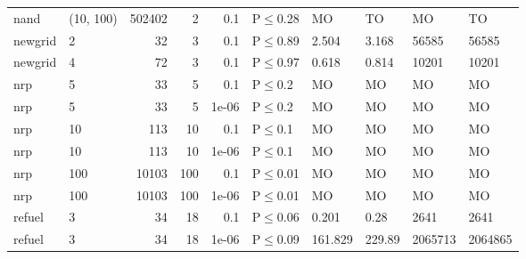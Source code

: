 \begin{longtable}{llrrrlllll}
 nand          & (10, 100) & 	502402 &   2 & 0.1   & P$\leq$0.28  & MO      & TO      & MO      & TO      \\
 newgrid       & 2         &     	32 &   3 & 0.1   & P$\leq$0.89  & 2.504   & 3.168   & 56585   & 56585   \\
 newgrid       & 4         &     	72 &   3 & 0.1   & P$\leq$0.97  & 0.618   & 0.814   & 10201   & 10201   \\
 nrp           & 5         &     	33 &   5 & 0.1   & P$\leq$0.2   & MO      & MO      & MO      & MO      \\
 nrp           & 5         &     	33 &   5 & 1e-06 & P$\leq$0.2   & MO      & MO      & MO      & MO      \\
 nrp           & 10        &    	113 &  10 & 0.1   & P$\leq$0.1   & MO      & MO      & MO      & MO      \\
 nrp           & 10        &    	113 &  10 & 1e-06 & P$\leq$0.1   & MO      & MO      & MO      & MO      \\
 nrp           & 100       &  	10103 & 100 & 0.1   & P$\leq$0.01  & MO      & MO      & MO      & MO      \\
 nrp           & 100       &  	10103 & 100 & 1e-06 & P$\leq$0.01  & MO      & MO      & MO      & MO      \\
 refuel        & 3         &     	34 &  18 & 0.1   & P$\leq$0.06  & 0.201   & 0.28    & 2641    & 2641    \\
 refuel        & 3         &     	34 &  18 & 1e-06 & P$\leq$0.09  & 161.829 & 229.89  & 2065713 & 2064865 \\
\bottomrule
\end{longtable}
